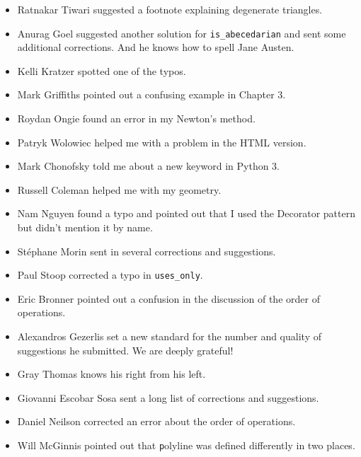 \documentclass[
DIV=11,
fontsize=12,
twoside,
headinclude=false,
titlepage=firstiscover,
abstract=true,
headsepline=true,
footsepline=true,
chapterprefix=true, %
headings=big,
bibliography=totoc,%
captions=tableheading
]{scrbook}
\theoremstyle{definition}
\begin{document}
\begin{itemize}
\item Ratnakar Tiwari suggested a footnote explaining degenerate
triangles.

\item Anurag Goel suggested another solution for \verb"is_abecedarian"
and sent some additional corrections.  And he knows how to
spell Jane Austen.

\item Kelli Kratzer spotted one of the typos.

\item Mark Griffiths pointed out a confusing example in Chapter 3.

\item Roydan Ongie found an error in my Newton's method.

\item Patryk Wolowiec helped me with a problem in the HTML version.

\item Mark Chonofsky told me about a new keyword in Python 3.

\item Russell Coleman helped me with my geometry.

\item Nam Nguyen found a typo and pointed out that I used the Decorator
pattern but didn't mention it by name.

\item St\'{e}phane Morin sent in several corrections and suggestions.

\item Paul Stoop corrected a typo in \verb+uses_only+.

\item Eric Bronner pointed out a confusion in the discussion of the
order of operations.

\item Alexandros Gezerlis set a new standard for the number and
quality of suggestions he submitted.  We are deeply grateful!

\item Gray Thomas knows his right from his left.

\item Giovanni Escobar Sosa sent a long list of corrections and
suggestions.

\item Daniel Neilson corrected an error about the order of operations.

\item Will McGinnis pointed out that {\texttt polyline} was defined
differently in two places.


\end{itemize}
\end{document}
